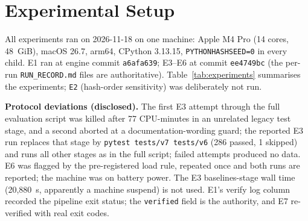 \section{Experimental Setup}\label{sec:setup}
All experiments ran on 2026-11-18 on one machine: Apple M4 Pro (14 cores, 48~GiB), macOS 26.7, arm64, CPython 3.13.15, \texttt{PYTHONHASHSEED=0} in every child. E1 ran at engine commit \texttt{a6afa639}; E3--E6 at commit \texttt{ee4749bc} (the per-run \texttt{RUN\_RECORD.md} files are authoritative). Table~\ref{tab:experiments} summarises the experiments; \texttt{E2} (hash-order sensitivity) was deliberately not run.

\begin{table}[t]\centering\scriptsize\setlength{\tabcolsep}{3pt}
\caption{Phase 2 experiments (all local, exploratory, non-pristine data). Raw evidence archives are outside git; compact outputs are in .}\label{tab:experiments}
\end{table}

\textbf{Protocol deviations (disclosed).} The first E3 attempt through the full evaluation script was killed after 77 CPU-minutes in an unrelated legacy test stage, and a second aborted at a documentation-wording guard; the reported E3 run replaces that stage by \texttt{pytest tests/v7 tests/v6} (286 passed, 1 skipped) and runs all other stages as in the full script; failed attempts produced no data. E6 was flagged by the pre-registered load rule, repeated once and both runs are reported; the machine was on battery power. The E3 baselines-stage wall time (20,880~s, apparently a machine suspend) is not used. E1's verify log column recorded the pipeline exit status; the \texttt{verified} field is the authority, and E7 re-verified with real exit codes.
